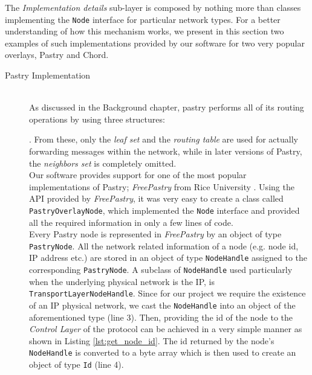 \documentclass[a4paper,11pt,twoside]{report}
\newcommand{\classname}[1]{\texttt{#1}}
\begin{document}
The \textit{Implementation details} sub-layer is composed by nothing more than classes implementing the \classname{Node} interface for particular network types. For a better understanding of how this mechanism works, we present in this section two examples of such implementations provided by our software for two very popular overlays, Pastry and Chord.

\begin{description}
\item[Pastry Implementation] \hfill \\

As discussed in the Background chapter, pastry performs all of its routing operations by using three structures: . From these, only the \textit{leaf set} and the \textit{routing table} are used for actually forwarding messages within the network, while in later versions of Pastry, the \textit{neighbors set} is completely omitted.\\

Our software provides support for one of the most popular implementations of Pastry; \textit{FreePastry} from Rice University \cite{FreePastry}. Using the API provided by \textit{FreePastry}, it was very easy to create a class called \classname{PastryOverlayNode}, which implemented the \classname{Node} interface and provided all the required information in only a few lines of code. \\

Every Pastry node is represented in \textit{FreePastry} by an object of type \classname{PastryNode}. All the network related information of a node (e.g. node id, IP address etc.) are stored in an object of type \classname{NodeHandle} assigned to the corresponding \classname{PastryNode}. A subclass of \classname{NodeHandle} used particularly when the underlying physical network is the IP, is \classname{TransportLayerNodeHandle}. Since for our project we require the existence of an IP physical network, we cast the \classname{NodeHandle} into an object of the aforementioned type (line 3). Then, providing the id of the node to the \textit{Control Layer} of the protocol can be achieved in a very simple manner as shown in Listing \ref{lst:get_node_id}. The id returned by the node's \classname{NodeHandle} is converted to a byte array which is then used to create an object of type \classname{Id} (line 4).


\end{description}
\end{document}
